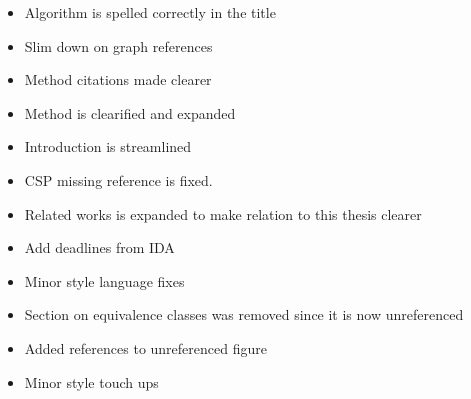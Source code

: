 \documentclass[msc,lith,english]{liuthesis}
\begin{document}
\begin{itemize}
  \item Algorithm is spelled correctly in the title
  \item Slim down on graph references
  \item Method citations made clearer
  \item Method is clearified and expanded
  \item Introduction is streamlined
  \item CSP missing reference is fixed. 
  \item Related works is expanded to make relation to this thesis clearer
  \item Add deadlines from IDA
  \item Minor style language fixes
  \item Section on equivalence classes was removed since it is now unreferenced
  \item Added references to unreferenced figure
  \item Minor style touch ups
\end{itemize}
\end{document}
